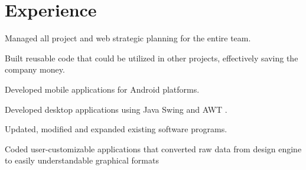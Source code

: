 \documentclass[letterpaper]{deedy-resume} %
\begin{document}
\begin{minipage}[t]{0.66\textwidth} %


\section{Experience}


\vspace{\topsep} %
\begin{tightitemize}
\item	Managed all project and web strategic planning for the entire team.
\item Built reusable code that could be utilized in other projects, effectively saving the company money.
\item Developed mobile applications for Android platforms.
\item	Developed desktop applications using Java Swing and AWT .
\item Updated, modified and expanded existing software programs.
\item Coded user-customizable applications that converted raw data from design  engine to easily understandable graphical formats

\end{tightitemize}



\end{minipage}
\end{document}
